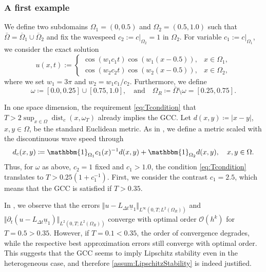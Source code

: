 \documentclass[sn-mathphys-num]{sn-jnl}
\numberwithin{equation}{section}
\newcommand{\ul}{\underline{u}}
\begin{document}
\subsubsection{A first example}\label{sec:numex:1D:simple}
 We define two subdomains $\Omega_1 = (0,0.5)$ and $\Omega_2 = (0.5,1.0)$ such that $\bar{\Omega} = \overline{\Omega}_1 \cup \overline{\Omega}_2$ and fix the wavespeed $c_2 := c \vert_{\Omega_2} = 1$ in $\Omega_2$. For variable $c_1 := c \vert_{\Omega_1}$, we consider the exact solution \cite{MHI08}
\begin{equation}\label{eq:1D:exact:simple}
    u(x,t) := \begin{cases}
        \cos(w_1 c_1 t) \cos(w_1(x-0.5)), & x \in \Omega_1, \\
        \cos(w_2 c_2 t) \cos(w_2(x-0.5)), & x \in \Omega_2,
    \end{cases}
\end{equation}
where we set $w_1 = 3 \pi$ and $w_2 = w_1 c_1 / c_2$. Furthermore, we define
\begin{equation}
	\omega \coloneqq [0.0,0.25] \cup [0.75,1.0], \quad \text{and} \quad \Omega_R \coloneqq \bar{\Omega} \setminus \omega = [0.25,0.75].
\end{equation}


In one space dimension, the requirement \eqref{eq:Tcondition} that $T > 2 \sup_{x \in \Omega} \operatorname{dist}_{c}(x,\omega_T)$ already implies the GCC. Let $d(x,y) \coloneqq \vert x - y \vert$, $x, y \in \Omega$, be the standard Euclidean metric. As in \cite{Filippas22}, we define a metric scaled with the discontinuous wave speed through
\begin{equation}
    d_c(x,y) \coloneqq \mathbbm{1}_{\Omega_1} c_1(x)^{-1} d(x,y) + \mathbbm{1}_{\Omega_2} d(x,y), \quad x,y \in \Omega.
\end{equation}
Thus, for $\omega$ as above, $c_2 = 1$ fixed and $c_1 > 1.0$, the condition \eqref{eq:Tcondition} translates to $T > 0.25(1+c_1^{-1})$. First, we consider the contrast $c_1 = 2.5$, which means that the GCC is satisfied if $T > 0.35$. 

In , we observe that the errors $\Vert u-L_{\Delta t} \ul_1 \Vert_{L^\infty(0,T;L^2(\Omega_R))}$ and $\Vert \partial_t (u-L_{\Delta t} \ul_1) \Vert_{L^2(0,T;L^2(\Omega_R))}$ converge with optimal order $\mathcal{O}(h^k)$ for $T = 0.5 > 0.35$. However, if $T = 0.1 < 0.35$, the order of convergence degrades, while the respective best approximation errors still converge with optimal order. This suggests that the GCC seems to imply Lipschitz stability even in the heterogeneous case, and therefore \cref{assum:LipschitzStability} is indeed justified.
\end{document}
